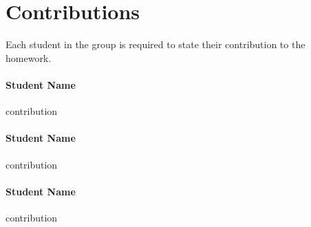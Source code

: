 \section*{Contributions}
Each student in the group is required to state their contribution to the homework.

\paragraph{Student Name} contribution

\paragraph{Student Name} contribution

\paragraph{Student Name} contribution
